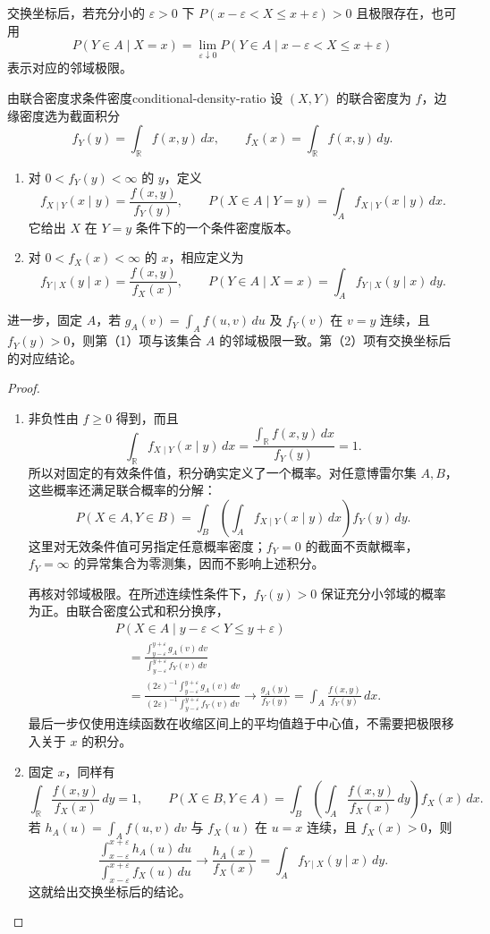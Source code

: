 交换坐标后，若充分小的 $\varepsilon>0$ 下 $P(x-\varepsilon<X\leq x+\varepsilon)>0$ 且极限存在，也可用
\[
P(Y\in A\mid X=x)=
\lim_{\varepsilon\downarrow0}P(Y\in A\mid x-\varepsilon<X\leq x+\varepsilon)
\]
表示对应的邻域极限。

\begin{mytheorem}{由联合密度求条件密度}{conditional-density-ratio}
设 $(X,Y)$ 的联合密度为 $f$，边缘密度选为截面积分
\[
f_Y(y)=\int_{\mathbb R}f(x,y)\,dx,\qquad
f_X(x)=\int_{\mathbb R}f(x,y)\,dy.
\]
\begin{enumerate}
\item 对 $0<f_Y(y)<\infty$ 的 $y$，定义
\[
f_{X\mid Y}(x\mid y)=\frac{f(x,y)}{f_Y(y)},\qquad
P(X\in A\mid Y=y)=\int_Af_{X\mid Y}(x\mid y)\,dx.
\]
它给出 $X$ 在 $Y=y$ 条件下的一个条件密度版本。
\item 对 $0<f_X(x)<\infty$ 的 $x$，相应定义为
\[
f_{Y\mid X}(y\mid x)=\frac{f(x,y)}{f_X(x)},\qquad
P(Y\in A\mid X=x)=\int_Af_{Y\mid X}(y\mid x)\,dy.
\]
\end{enumerate}
进一步，固定 $A$，若 $g_A(v)=\int_Af(u,v)\,du$ 及 $f_Y(v)$ 在 $v=y$ 连续，且 $f_Y(y)>0$，则第（1）项与该集合 $A$ 的邻域极限一致。第（2）项有交换坐标后的对应结论。
\end{mytheorem}

\begin{proof}
\begin{enumerate}
\item 非负性由 $f\geq0$ 得到，而且
\[
\int_{\mathbb R}f_{X\mid Y}(x\mid y)\,dx
=\frac{\int_{\mathbb R}f(x,y)\,dx}{f_Y(y)}=1.
\]
所以对固定的有效条件值，积分确实定义了一个概率。对任意博雷尔集 $A,B$，这些概率还满足联合概率的分解：
\[
P(X\in A,Y\in B)
=\int_B\left(\int_A f_{X\mid Y}(x\mid y)\,dx\right)f_Y(y)\,dy.
\]
这里对无效条件值可另指定任意概率密度；$f_Y=0$ 的截面不贡献概率，$f_Y=\infty$ 的异常集合为零测集，因而不影响上述积分。

再核对邻域极限。在所述连续性条件下，$f_Y(y)>0$ 保证充分小邻域的概率为正。由联合密度公式和积分换序，
\begin{align*}
&P(X\in A\mid y-\varepsilon<Y\leq y+\varepsilon)\\
&\quad=\frac{\int_{y-\varepsilon}^{y+\varepsilon}g_A(v)\,dv}
 {\int_{y-\varepsilon}^{y+\varepsilon}f_Y(v)\,dv}\\
&\quad=\frac{(2\varepsilon)^{-1}\int_{y-\varepsilon}^{y+\varepsilon}g_A(v)\,dv}
 {(2\varepsilon)^{-1}\int_{y-\varepsilon}^{y+\varepsilon}f_Y(v)\,dv}
\longrightarrow \frac{g_A(y)}{f_Y(y)}
=\int_A\frac{f(x,y)}{f_Y(y)}\,dx.
\end{align*}
最后一步仅使用连续函数在收缩区间上的平均值趋于中心值，不需要把极限移入关于 $x$ 的积分。

\item 固定 $x$，同样有
\[
\int_{\mathbb R}\frac{f(x,y)}{f_X(x)}\,dy=1,
\qquad
P(X\in B,Y\in A)
=\int_B\left(\int_A\frac{f(x,y)}{f_X(x)}\,dy\right)f_X(x)\,dx.
\]
若 $h_A(u)=\int_A f(u,v)\,dv$ 与 $f_X(u)$ 在 $u=x$ 连续，且 $f_X(x)>0$，则
\[
\frac{\int_{x-\varepsilon}^{x+\varepsilon}h_A(u)\,du}
 {\int_{x-\varepsilon}^{x+\varepsilon}f_X(u)\,du}
\longrightarrow\frac{h_A(x)}{f_X(x)}
=\int_A f_{Y\mid X}(y\mid x)\,dy.
\]
这就给出交换坐标后的结论。
\end{enumerate}
\end{proof}

